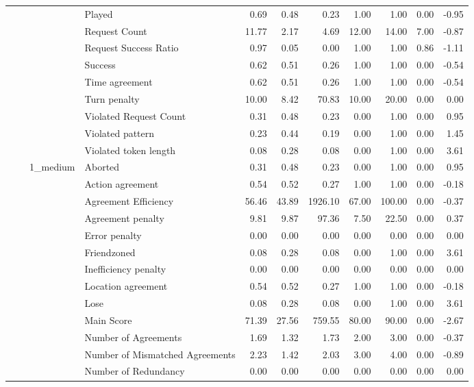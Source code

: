 \begin{tabular}{llllrrrrrrr}
 &  &  & Played & 0.69 & 0.48 & 0.23 & 1.00 & 1.00 & 0.00 & -0.95 \\
 &  &  & Request Count & 11.77 & 2.17 & 4.69 & 12.00 & 14.00 & 7.00 & -0.87 \\
 &  &  & Request Success Ratio & 0.97 & 0.05 & 0.00 & 1.00 & 1.00 & 0.86 & -1.11 \\
 &  &  & Success & 0.62 & 0.51 & 0.26 & 1.00 & 1.00 & 0.00 & -0.54 \\
 &  &  & Time agreement & 0.62 & 0.51 & 0.26 & 1.00 & 1.00 & 0.00 & -0.54 \\
 &  &  & Turn penalty & 10.00 & 8.42 & 70.83 & 10.00 & 20.00 & 0.00 & 0.00 \\
 &  &  & Violated Request Count & 0.31 & 0.48 & 0.23 & 0.00 & 1.00 & 0.00 & 0.95 \\
 &  &  & Violated pattern & 0.23 & 0.44 & 0.19 & 0.00 & 1.00 & 0.00 & 1.45 \\
 &  &  & Violated token length & 0.08 & 0.28 & 0.08 & 0.00 & 1.00 & 0.00 & 3.61 \\
\cline{3-11}
 &  & \multirow[t]{27}{*}{1_medium} & Aborted & 0.31 & 0.48 & 0.23 & 0.00 & 1.00 & 0.00 & 0.95 \\
 &  &  & Action agreement & 0.54 & 0.52 & 0.27 & 1.00 & 1.00 & 0.00 & -0.18 \\
 &  &  & Agreement Efficiency & 56.46 & 43.89 & 1926.10 & 67.00 & 100.00 & 0.00 & -0.37 \\
 &  &  & Agreement penalty & 9.81 & 9.87 & 97.36 & 7.50 & 22.50 & 0.00 & 0.37 \\
 &  &  & Error penalty & 0.00 & 0.00 & 0.00 & 0.00 & 0.00 & 0.00 & 0.00 \\
 &  &  & Friendzoned & 0.08 & 0.28 & 0.08 & 0.00 & 1.00 & 0.00 & 3.61 \\
 &  &  & Inefficiency penalty & 0.00 & 0.00 & 0.00 & 0.00 & 0.00 & 0.00 & 0.00 \\
 &  &  & Location agreement & 0.54 & 0.52 & 0.27 & 1.00 & 1.00 & 0.00 & -0.18 \\
 &  &  & Lose & 0.08 & 0.28 & 0.08 & 0.00 & 1.00 & 0.00 & 3.61 \\
 &  &  & Main Score & 71.39 & 27.56 & 759.55 & 80.00 & 90.00 & 0.00 & -2.67 \\
 &  &  & Number of Agreements & 1.69 & 1.32 & 1.73 & 2.00 & 3.00 & 0.00 & -0.37 \\
 &  &  & Number of Mismatched Agreements & 2.23 & 1.42 & 2.03 & 3.00 & 4.00 & 0.00 & -0.89 \\
 &  &  & Number of Redundancy & 0.00 & 0.00 & 0.00 & 0.00 & 0.00 & 0.00 & 0.00 \\

\end{tabular}
